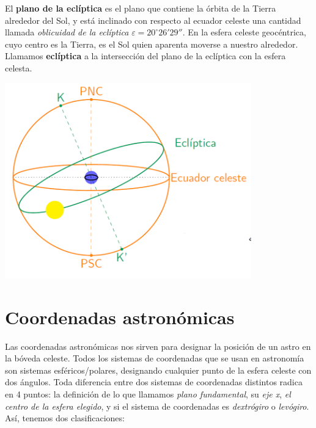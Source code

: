 \hspace{-6.0mm}
\begin{minipage}{0.6\textwidth}
El \textbf{plano de la eclíptica} es el plano que contiene la órbita de la Tierra alrededor del Sol, y está inclinado con respecto al ecuador celeste una cantidad llamada \textit{oblicuidad de la eclíptica} $\varepsilon=20^\circ 26'29''$. En la esfera celeste geocéntrica, cuyo centro es la Tierra, es el Sol quien aparenta moverse a nuestro alrededor. Llamamos \textbf{eclíptica} a la intersección del plano de la eclíptica con la esfera celesta. %
\end{minipage}	\hfill
\begin{minipage}{0.4\textwidth} \centering
		\includegraphics[width=0.8\textwidth]{Cuerpo/Imagenes/01_Ecliptica.png}	
\end{minipage}	



\section{Coordenadas astronómicas}

Las coordenadas astronómicas nos sirven para designar la posición de un astro en la bóveda celeste. Todos los sistemas de coordenadas que se usan en astronomía son sistemas esféricos/polares, designando cualquier punto de la esfera celeste con dos ángulos. Toda diferencia entre dos sistemas de coordenadas distintos radica en 4 puntos: la definición de lo que llamamos \textit{plano fundamental}, su \textit{eje x}, \textit{el centro de la esfera elegido}, y si el sistema de coordenadas es \textit{dextrógiro} o \textit{levógiro}. Así, tenemos dos clasificaciones:

